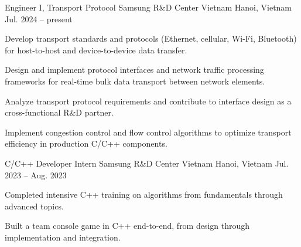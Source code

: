 
\begin{cventries}

  \cventry
  {Engineer I, Transport Protocol} %
  {Samsung R\&D Center Vietnam} %
  {Hanoi, Vietnam} %
  {Jul. 2024 -- present} %
  {
    \begin{cvitems} %
      \item {Develop transport standards and protocols (Ethernet, cellular, Wi-Fi, Bluetooth) for host-to-host and device-to-device data transfer.}
      \item {Design and implement protocol interfaces and network traffic processing frameworks for real-time bulk data transport between network elements.}
      \item {Analyze transport protocol requirements and contribute to interface design as a cross-functional R\&D partner.}
      \item {Implement congestion control and flow control algorithms to optimize transport efficiency in production C/C++ components.}
    \end{cvitems}
  }

  \cventry
  {C/C++ Developer Intern} %
  {Samsung R\&D Center Vietnam} %
  {Hanoi, Vietnam} %
  {Jul. 2023 -- Aug. 2023} %
  {
    \begin{cvitems} %
      \item {Completed intensive C++ training on algorithms from fundamentals through advanced topics.}
      \item {Built a team console game in C++ end-to-end, from design through implementation and integration.}
    \end{cvitems}
  }

\end{cventries}

